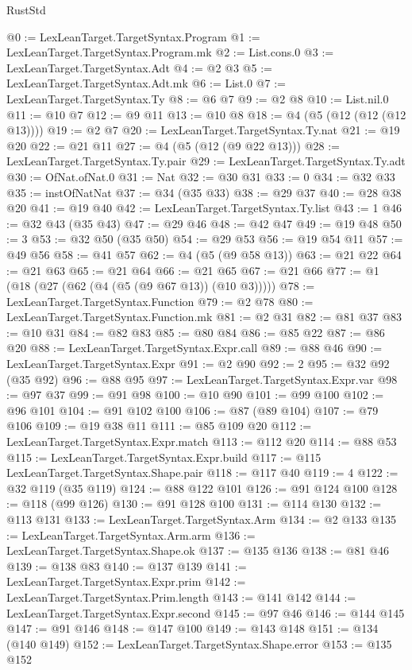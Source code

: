 \begin{lexlean}{RustStd}
\begin{coremodule}
@0 := LexLeanTarget.TargetSyntax.Program
@1 := LexLeanTarget.TargetSyntax.Program.mk
@2 := List.cons.{0}
@3 := LexLeanTarget.TargetSyntax.Adt
@4 := @2 @3
@5 := LexLeanTarget.TargetSyntax.Adt.mk
@6 := List.{0}
@7 := LexLeanTarget.TargetSyntax.Ty
@8 := @6 @7
@9 := @2 @8
@10 := List.nil.{0}
@11 := @10 @7
@12 := @9 @11
@13 := @10 @8
@18 := @4 (@5 (@12 (@12 (@12 @13))))
@19 := @2 @7
@20 := LexLeanTarget.TargetSyntax.Ty.nat
@21 := @19 @20
@22 := @21 @11
@27 := @4 (@5 (@12 (@9 @22 @13)))
@28 := LexLeanTarget.TargetSyntax.Ty.pair
@29 := LexLeanTarget.TargetSyntax.Ty.adt
@30 := OfNat.ofNat.{0}
@31 := Nat
@32 := @30 @31
@33 := 0
@34 := @32 @33
@35 := instOfNatNat
@37 := @34 (@35 @33)
@38 := @29 @37
@40 := @28 @38 @20
@41 := @19 @40
@42 := LexLeanTarget.TargetSyntax.Ty.list
@43 := 1
@46 := @32 @43 (@35 @43)
@47 := @29 @46
@48 := @42 @47
@49 := @19 @48
@50 := 3
@53 := @32 @50 (@35 @50)
@54 := @29 @53
@56 := @19 @54 @11
@57 := @49 @56
@58 := @41 @57
@62 := @4 (@5 (@9 @58 @13))
@63 := @21 @22
@64 := @21 @63
@65 := @21 @64
@66 := @21 @65
@67 := @21 @66
@77 := @1 (@18 (@27 (@62 (@4 (@5 (@9 @67 @13)) (@10 @3)))))
@78 := LexLeanTarget.TargetSyntax.Function
@79 := @2 @78
@80 := LexLeanTarget.TargetSyntax.Function.mk
@81 := @2 @31
@82 := @81 @37
@83 := @10 @31
@84 := @82 @83
@85 := @80 @84
@86 := @85 @22
@87 := @86 @20
@88 := LexLeanTarget.TargetSyntax.Expr.call
@89 := @88 @46
@90 := LexLeanTarget.TargetSyntax.Expr
@91 := @2 @90
@92 := 2
@95 := @32 @92 (@35 @92)
@96 := @88 @95
@97 := LexLeanTarget.TargetSyntax.Expr.var
@98 := @97 @37
@99 := @91 @98
@100 := @10 @90
@101 := @99 @100
@102 := @96 @101
@104 := @91 @102 @100
@106 := @87 (@89 @104)
@107 := @79 @106
@109 := @19 @38 @11
@111 := @85 @109 @20
@112 := LexLeanTarget.TargetSyntax.Expr.match
@113 := @112 @20
@114 := @88 @53
@115 := LexLeanTarget.TargetSyntax.Expr.build
@117 := @115 LexLeanTarget.TargetSyntax.Shape.pair
@118 := @117 @40
@119 := 4
@122 := @32 @119 (@35 @119)
@124 := @88 @122 @101
@126 := @91 @124 @100
@128 := @118 (@99 @126)
@130 := @91 @128 @100
@131 := @114 @130
@132 := @113 @131
@133 := LexLeanTarget.TargetSyntax.Arm
@134 := @2 @133
@135 := LexLeanTarget.TargetSyntax.Arm.arm
@136 := LexLeanTarget.TargetSyntax.Shape.ok
@137 := @135 @136
@138 := @81 @46
@139 := @138 @83
@140 := @137 @139
@141 := LexLeanTarget.TargetSyntax.Expr.prim
@142 := LexLeanTarget.TargetSyntax.Prim.length
@143 := @141 @142
@144 := LexLeanTarget.TargetSyntax.Expr.second
@145 := @97 @46
@146 := @144 @145
@147 := @91 @146
@148 := @147 @100
@149 := @143 @148
@151 := @134 (@140 @149)
@152 := LexLeanTarget.TargetSyntax.Shape.error
@153 := @135 @152

\end{coremodule}
\end{lexlean}
